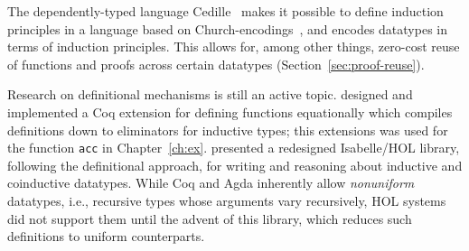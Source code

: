 The dependently-typed language Cedille~\citep{stump2017calculus} makes it possible to define induction principles
in a language based on Church-encodings~\citep{Church1941}, and encodes datatypes in terms of induction principles. 
This allows for, among other things, zero-cost reuse of functions and proofs across certain datatypes (Section~\ref{sec:proof-reuse}).

Research on definitional mechanisms is still an active topic.
\citet{Sozeau2010} designed and implemented a Coq extension for defining functions equationally which compiles definitions down to eliminators for inductive types; this extensions was used for the function \lstinline{acc} in Chapter~\ref{ch:ex}. \citet{Biendarra2017} presented a redesigned Isabelle/HOL library, following the definitional approach, for writing and reasoning about inductive and coinductive datatypes. While Coq and Agda inherently allow \emph{nonuniform} datatypes, i.e., recursive types whose arguments vary recursively, HOL systems did not support them until the advent of this library, which reduces such definitions to uniform counterparts.



